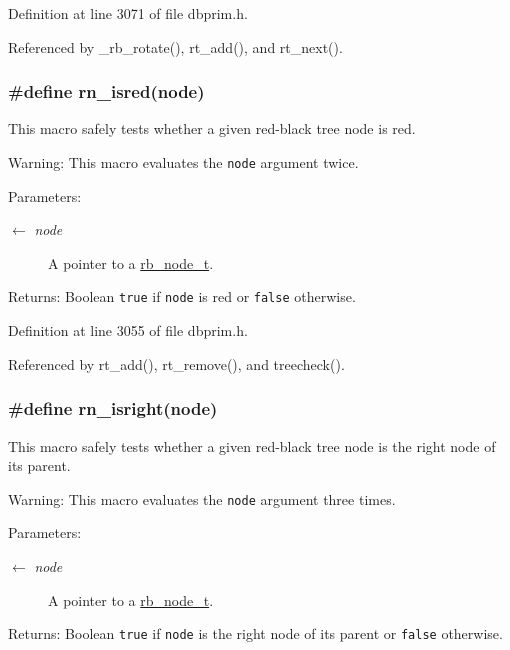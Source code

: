 Definition at line 3071 of file dbprim.h.

Referenced by \_\-rb\_\-rotate(), rt\_\-add(), and rt\_\-next().\hypertarget{group__dbprim__rbtree_ga40}{
\subsubsection[rn\_\-isred]{\setlength{\rightskip}{0pt plus 5cm}\#define rn\_\-isred(node)}}
\label{group__dbprim__rbtree_ga40}


This macro safely tests whether a given red-black tree node is red.

\begin{Desc}
\item[Warning:]This macro evaluates the {\tt node} argument twice.\end{Desc}
\begin{Desc}
\item[Parameters:]
\begin{description}
\item[\mbox{$\leftarrow$} {\em node}]A pointer to a \hyperlink{group__dbprim__rbtree_ga1}{rb\_\-node\_\-t}.\end{description}
\end{Desc}
\begin{Desc}
\item[Returns:]Boolean {\tt true} if {\tt node} is red or {\tt false} otherwise.\end{Desc}


Definition at line 3055 of file dbprim.h.

Referenced by rt\_\-add(), rt\_\-remove(), and treecheck().\hypertarget{group__dbprim__rbtree_ga42}{
\subsubsection[rn\_\-isright]{\setlength{\rightskip}{0pt plus 5cm}\#define rn\_\-isright(node)}}
\label{group__dbprim__rbtree_ga42}


This macro safely tests whether a given red-black tree node is the right node of its parent.

\begin{Desc}
\item[Warning:]This macro evaluates the {\tt node} argument three times.\end{Desc}
\begin{Desc}
\item[Parameters:]
\begin{description}
\item[\mbox{$\leftarrow$} {\em node}]A pointer to a \hyperlink{group__dbprim__rbtree_ga1}{rb\_\-node\_\-t}.\end{description}
\end{Desc}
\begin{Desc}
\item[Returns:]Boolean {\tt true} if {\tt node} is the right node of its parent or {\tt false} otherwise.\end{Desc}


